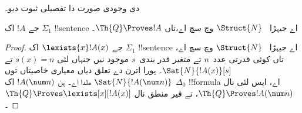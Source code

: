 \documentclass[../../../include/open-logic-section]{subfiles}
\begin{document}
\begin{prob}
 دی وجودی صورت دا تفصیلی ثبوت دیو۔
\end{prob}

\begin{thm}
جے $!A$ اک $\Sigma_1$ !!{sentence} اے جیہڑا
~$\Struct{N}$ وچ سچ اے،تاں $\Th{Q} \Proves !A$۔
\end{thm}

\begin{proof}
جے $\lexists{x}!A(x)$ اک $\Sigma_1$ !!{sentence} اے جیہڑا
~$\Struct{N}$ وچ سچ اے، تاں کوئی قدرتی عدد~$n$ تے متغیر
قدر بندی~$s$ موجود نیں جنہاں لئی $s(x) = n$ تے
$\Sat{N}{!A(x)}[s]$۔ پورا اترن دے تعلق دیاں معیاری خاصیتاں
توں $\Sat{N}{!A(\num n)}$ ملدا اے۔ ہن $!A(\num n)$ اک
$\Delta_0$ !!{formula} اے، ایس لئی 
نال $\Th{Q} \Proves !A(\num n)$، تے فیر منطق نال
$\Th{Q} \Proves \lexists[x][!A(x)]$۔
\end{proof}
\end{document}
